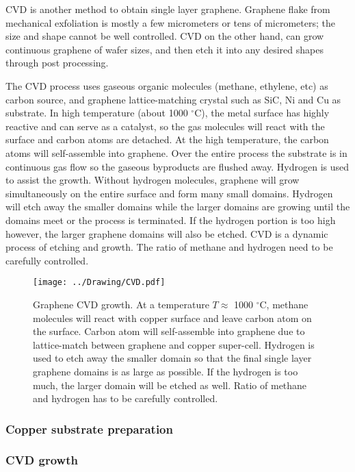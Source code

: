 \documentclass[pdftex, sectionletters]{pittetd}    %
\begin{document}
CVD is another method to obtain single layer graphene. Graphene flake from mechanical exfoliation is mostly a few micrometers or tens of micrometers; the size and shape cannot be well controlled. CVD on the other hand, can grow continuous graphene of wafer sizes\cite{}, and then etch it into any desired shapes through post processing. 

The CVD process uses gaseous organic molecules (methane, ethylene, etc) as carbon source, and graphene lattice-matching crystal such as SiC, Ni and Cu as substrate. In high temperature (about 1000 $^{\circ}$C), the metal surface has highly reactive and can serve as a catalyst, so the gas molecules will react with the surface and carbon atoms are detached. At the high temperature, the carbon atoms will self-assemble into graphene. Over the entire process the substrate is in continuous gas flow so the gaseous byproducts are flushed away. Hydrogen is used to assist the growth. Without hydrogen molecules, graphene will grow simultaneously on the entire surface and form many small domains. Hydrogen will etch away the smaller domains while the larger domains are growing\cite{} until the domains meet or the process is terminated. If the hydrogen portion is too high however, the larger graphene domains will also be etched. CVD is a dynamic process of etching and growth. The ratio of methane and hydrogen need to be carefully controlled.

\begin{figure}[h!]
	\centering
	\texttt{[image: ../Drawing/CVD.pdf]}
	\caption{Graphene CVD growth. At a temperature $T \approx$ 1000 $^{\circ}$C, methane molecules will react with copper surface and leave carbon atom on the surface. Carbon atom will self-assemble into graphene due to lattice-match between graphene and copper super-cell. Hydrogen is used to etch away the smaller domain so that the final single layer graphene domains is as large as possible. If the hydrogen is too much, the larger domain will be etched as well. Ratio of methane and hydrogen has to be carefully controlled.}
	\label{FIG:CVD}
\end{figure}

\subsubsection{Copper substrate preparation}

\subsubsection{CVD growth}
\end{document}
